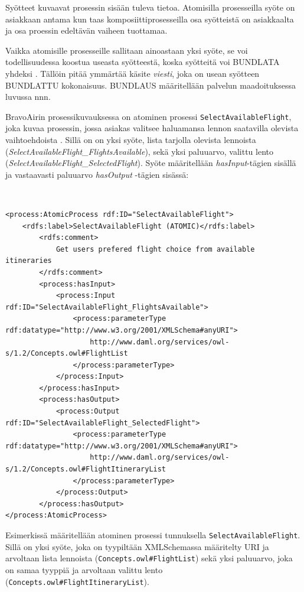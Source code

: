\documentclass[finnish]{tktltiki2}
\theoremstyle{definition}
\theoremstyle{remark}
\begin{document}
Syötteet kuvaavat prosessin sisään tuleva tietoa\cite{OWLS}. Atomisilla prosesseilla syöte on asiakkaan antama kun taas komposiittiprosesseilla osa syötteistä on asiakkaalta ja osa proessin edeltävän vaiheen tuottamaa. 

Vaikka atomisille prosesseille sallitaan ainoastaan yksi syöte, se voi todellisuudessa koostua useasta syötteestä, koska syötteitä voi BUNDLATA yhdeksi \cite{OWLS}. Tällöin pitää ymmärtää käsite \textit{viesti}, joka on usean syötteen BUNDLATTU kokonaisuus. BUNDLAUS määritellään palvelun maadoituksessa luvussa nnn. 

BravoAirin prosessikuvauksessa on atominen prosessi \texttt{SelectAvailableFlight}, joka kuvaa prosessin, jossa asiakas valitsee haluamansa lennon saatavilla olevista vaihtoehdoista \cite{daml}. Sillä on on yksi syöte, lista tarjolla olevista lennoista (\textit{SelectAvailableFlight\_FlightsAvailable}), sekä yksi paluuarvo, valittu lento (\textit{SelectAvailableFlight\_SelectedFlight}). Syöte määritellään \textit{hasInput}-tägien sisällä ja vastaavasti paluuarvo \textit{hasOutput} -tägien sisässä\cite{daml}:

\
\begin{verbatim}
<process:AtomicProcess rdf:ID="SelectAvailableFlight">
    <rdfs:label>SelectAvailableFlight (ATOMIC)</rdfs:label>
        <rdfs:comment>
            Get users prefered flight choice from available itineraries
        </rdfs:comment>
        <process:hasInput>
            <process:Input rdf:ID="SelectAvailableFlight_FlightsAvailable">
                <process:parameterType rdf:datatype="http://www.w3.org/2001/XMLSchema#anyURI">
                    http://www.daml.org/services/owl-s/1.2/Concepts.owl#FlightList
                </process:parameterType>
            </process:Input>
        </process:hasInput>
        <process:hasOutput>
            <process:Output rdf:ID="SelectAvailableFlight_SelectedFlight">
                <process:parameterType rdf:datatype="http://www.w3.org/2001/XMLSchema#anyURI">
                    http://www.daml.org/services/owl-s/1.2/Concepts.owl#FlightItineraryList
                </process:parameterType>
            </process:Output>
        </process:hasOutput>
</process:AtomicProcess>
\end{verbatim}


Esimerkissä määritellään atominen prosessi tunnuksella \texttt{SelectAvailableFlight}. Sillä on yksi syöte, joka on tyypiltään XMLSchemassa määritelty  URI ja arvoltaan lista lennoista (\texttt{Concepts.owl\#FlightList}) sekä yksi paluuarvo, joka on samaa tyyppiä ja arvoltaan valittu lento (\texttt{Concepts.owl\#FlightItineraryList}). 
\end{document}

